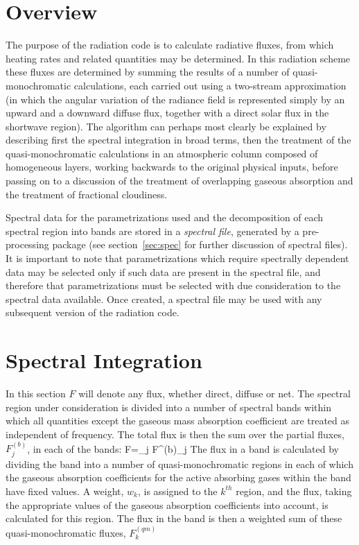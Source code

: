 \section{Overview}

The purpose of the radiation code is to calculate radiative fluxes, 
from which heating rates and related 
quantities may be determined. In this radiation scheme these fluxes are 
determined by summing the 
results of a number of quasi-monochromatic calculations, each carried 
out using a two-stream 
approximation (in which the angular variation of the radiance field is
represented simply by an upward and a downward diffuse flux, together
with a direct solar flux in the shortwave region).
The algorithm can perhaps most clearly be explained by describing first 
the spectral 
integration in broad terms, then the treatment of the 
quasi-monochromatic calculations in an 
atmospheric column composed of homogeneous layers, working backwards to 
the original physical 
inputs, before passing on to a discussion of the treatment of 
overlapping gaseous absorption and the 
treatment of fractional cloudiness.

\noindent
Spectral data for the parametrizations used and the decomposition of 
each spectral region into bands 
are stored in a {\em spectral file}, generated by a pre-processing 
package (see section~\ref{sec:spec} for further discussion of spectral files).
It is important to note that parametrizations which require 
spectrally dependent data may be 
selected only if such data are present in the spectral file, and 
therefore that parametrizations must be 
selected with due consideration to the spectral data available. Once 
created, a spectral file may be used 
with any subsequent version of the radiation code.

\section{Spectral Integration}

In this section $F$ will denote any flux, whether direct, diffuse or 
net. The spectral region under 
consideration is divided into a number of spectral bands within which 
all quantities except the gaseous 
mass absorption coefficient are treated as independent of frequency. 
The total flux is then the sum 
over the partial fluxes, $F^{(b)}_{j}$, in each of the bands:
\beq
F=\sum_{j} F^{(b)}_{j}
\label{p2_eq1}
\eeq 
The flux in a band is calculated by dividing the band into a number of 
quasi-monochromatic regions 
in each of which the gaseous absorption coefficients for the active 
absorbing gases within the band 
have fixed values. A weight, $w_{k}$, is assigned to the  $k^{th}$ 
region, and the flux, taking the appropriate 
values of the gaseous absorption coefficients
into account, is calculated for this 
region. The flux in the band is then 
a weighted sum of these quasi-monochromatic fluxes, $F^{(qm)}_{k}$      
        
